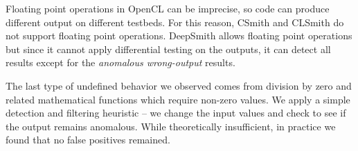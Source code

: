 Floating point operations in OpenCL can be imprecise, so code can produce different output on different testbeds. For this reason, CSmith and CLSmith do not support floating point operations. DeepSmith allows floating point operations but since it cannot apply differential testing on the outputs, it can detect all results except for the \emph{anomalous wrong-output} results.

The last type of undefined behavior we observed comes from division by zero and related mathematical functions which require non-zero values. We apply a simple detection and filtering heuristic -- we change the input values and check to see if the output remains anomalous. While theoretically insufficient, in practice we found that no false positives remained.




